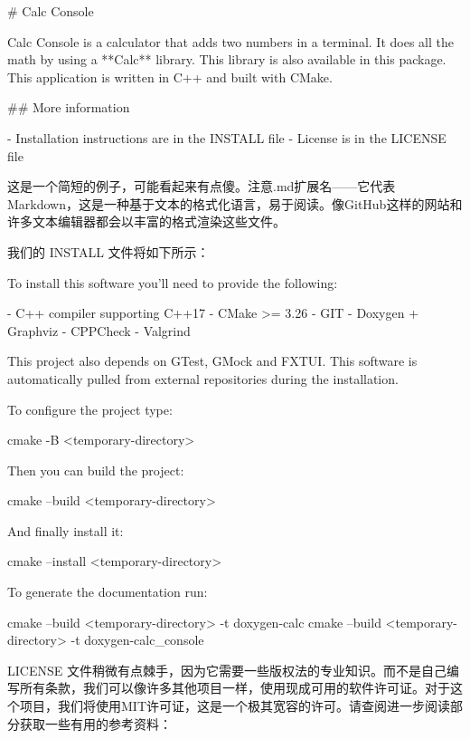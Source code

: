 
\begin{shell}
# Calc Console

Calc Console is a calculator that adds two numbers in a
terminal. It does all the math by using a **Calc** library.
This library is also available in this package.
This application is written in C++ and built with CMake.

## More information

- Installation instructions are in the INSTALL file
- License is in the LICENSE file
\end{shell}

这是一个简短的例子，可能看起来有点傻。注意.md扩展名——它代表Markdown，这是一种基于文本的格式化语言，易于阅读。像GitHub这样的网站和许多文本编辑器都会以丰富的格式渲染这些文件。

我们的 INSTALL 文件将如下所示：


\begin{shell}
To install this software you'll need to provide the following:

- C++ compiler supporting C++17
- CMake >= 3.26
- GIT
- Doxygen + Graphviz
- CPPCheck
- Valgrind

This project also depends on GTest, GMock and FXTUI. This
software is automatically pulled from external repositories
during the installation.

To configure the project type:

cmake -B <temporary-directory>

Then you can build the project:

cmake --build <temporary-directory>

And finally install it:

cmake --install <temporary-directory>

To generate the documentation run:

cmake --build <temporary-directory> -t doxygen-calc
cmake --build <temporary-directory> -t doxygen-calc_console
\end{shell}

LICENSE 文件稍微有点棘手，因为它需要一些版权法的专业知识。而不是自己编写所有条款，我们可以像许多其他项目一样，使用现成可用的软件许可证。对于这个项目，我们将使用MIT许可证，这是一个极其宽容的许可。请查阅进一步阅读部分获取一些有用的参考资料：


